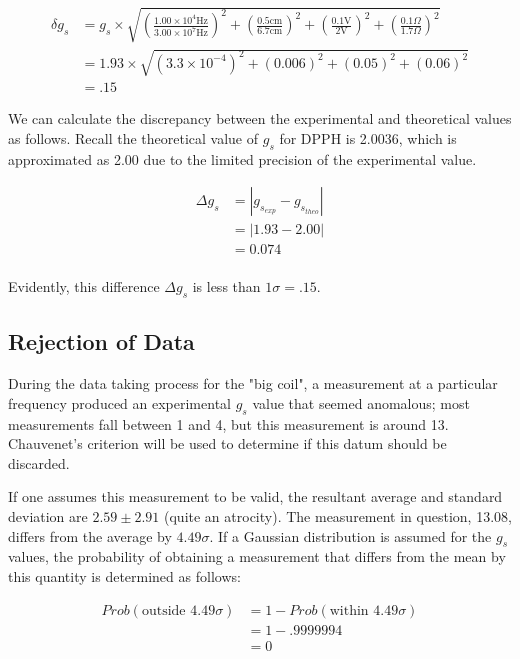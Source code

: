 \documentclass[a4paper]{article}
\begin{document}
\begin{align*}
\delta g_s &=
		   g_s \times
              \sqrt {
              		  \left( \frac{1.00 \times 10^4 \text{Hz}}{3.00 \times 10^7 \text{Hz}} \right) ^2
              		+ \left( \frac{0.5 \text{cm}}{6.7 \text{cm}} \right) ^2
              		+ \left( \frac{0.1 \text{V}}{2 \text{V}} \right) ^2
              		+ \left( \frac{0.1 \Omega}{1.7 \Omega} \right) ^2
					} \\
		  &= 1.93 \times
              \sqrt {
              		  \left( 3.3 \times 10^{-4} \right) ^2
              		+ \left( 0.006 \right) ^2
              		+ \left( 0.05 \right) ^2
              		+ \left( 0.06 \right) ^2
					} \\
		  &= .15
\end{align*}

We can calculate the discrepancy between the experimental and
theoretical values as follows. Recall the theoretical value of $g_s$
for DPPH is 2.0036, which is approximated as 2.00 due to the limited
precision of the experimental value.


\begin{align*}
\Delta g_s &= | g_{s_{exp}} - g_{s_{theo}} | \\ &= | 1.93 - 2.00 |
\\ &= 0.074 \\
\end{align*}

Evidently, this difference $\Delta g_s$ is less than $1 \sigma = .15$.

\subsection{Rejection of Data}
\qq During the data taking process for the "big coil", a measurement
at a particular frequency produced an experimental $g_s$ value that
seemed anomalous; most measurements fall between 1 and 4, but this
measurement is around 13. Chauvenet's criterion will be used to
determine if this datum should be discarded.

\qq If one assumes this measurement to be valid, the resultant average
and standard deviation are $2.59 \pm 2.91$ (quite an atrocity). The
measurement in question, 13.08, differs from the average by $4.49
\sigma$. If a Gaussian distribution is assumed for the $g_s$ values,
the probability of obtaining a measurement that differs from the mean
by this quantity is determined as follows:

\begin{align*}
Prob(\text{outside }  4.49 \sigma) &= 1 - Prob(\text{within } 4.49 \sigma) \\
							  &= 1 -  .9999994 \\
							  &= 0 \\
\end{align*}
\end{document}
